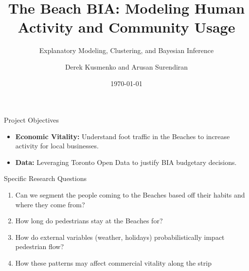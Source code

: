 \documentclass[10pt, aspectratio=169]{beamer}
\title[Beaches BIA]{The Beach BIA: Modeling Human Activity and Community Usage}
\subtitle{Explanatory Modeling, Clustering, and Bayesian Inference}
\author{Derek Kusmenko and Arusan Surendiran}
\date{\today}
\begin{document}
\begin{frame}
    \titlepage
\end{frame}

\begin{frame}{Project Objectives}

    \begin{itemize}
        \item \textbf{Economic Vitality:} Understand foot traffic in the Beaches to increase activity for local businesses.
        \item \textbf{Data:} Leveraging Toronto Open Data to justify BIA budgetary decisions.
    \end{itemize}
    
    \begin{block}{Specific Research Questions}
        \begin{enumerate}
            \item Can we segment the people coming to the Beaches based off their habits and where they come from?
            \item How long do pedestrians stay at the Beaches for?
            \item How do external variables (weather, holidays) probabilistically impact pedestrian flow?
            \item How these patterns may affect commercial vitality along the strip
        \end{enumerate}
    \end{block}
\end{frame}
\end{document}
